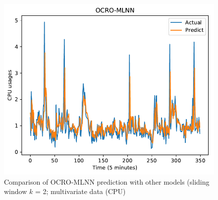\documentclass[smallcondensed, natbib]{svjour3}     %
\begin{document}
{\begin{figure}[!ht]
\begin{minipage}[b]{0.33\linewidth}
    \includegraphics[width=0.9\linewidth]{images/pdf/predict/k2/cpu_k2_ocro_mlnn.pdf} 
  \end{minipage} 
  
  \caption{Comparison of OCRO-MLNN prediction with other models (sliding window $k$ = 2; multivariate data (CPU)} 
  \label{predict_cpu_sliding2} 
\end{figure}

}
\end{document}
